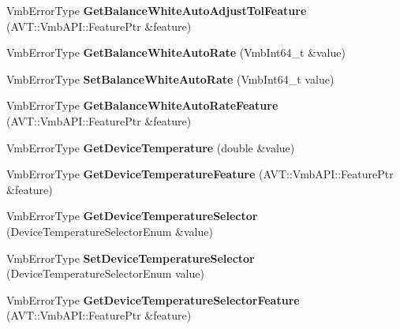 \begin{DoxyCompactItemize}
\item 
\hypertarget{classMakoCamera_aa852a35ea844d38b77ce4e8f1fbe74de}{Vmb\-Error\-Type {\bfseries Get\-Balance\-White\-Auto\-Adjust\-Tol\-Feature} (A\-V\-T\-::\-Vmb\-A\-P\-I\-::\-Feature\-Ptr \&feature)}\label{classMakoCamera_aa852a35ea844d38b77ce4e8f1fbe74de}

\item 
\hypertarget{classMakoCamera_ac4d858e1fc6bd4a1a4f96f51fa004ee5}{Vmb\-Error\-Type {\bfseries Get\-Balance\-White\-Auto\-Rate} (Vmb\-Int64\-\_\-t \&value)}\label{classMakoCamera_ac4d858e1fc6bd4a1a4f96f51fa004ee5}

\item 
\hypertarget{classMakoCamera_a0d52593c4b146e73b437f3cb22535bf0}{Vmb\-Error\-Type {\bfseries Set\-Balance\-White\-Auto\-Rate} (Vmb\-Int64\-\_\-t value)}\label{classMakoCamera_a0d52593c4b146e73b437f3cb22535bf0}

\item 
\hypertarget{classMakoCamera_a6f1bcee22a716067338e6f4e19fa2c5c}{Vmb\-Error\-Type {\bfseries Get\-Balance\-White\-Auto\-Rate\-Feature} (A\-V\-T\-::\-Vmb\-A\-P\-I\-::\-Feature\-Ptr \&feature)}\label{classMakoCamera_a6f1bcee22a716067338e6f4e19fa2c5c}

\item 
\hypertarget{classMakoCamera_a24e5dca7c7a8cf1701ace0496a3614f8}{Vmb\-Error\-Type {\bfseries Get\-Device\-Temperature} (double \&value)}\label{classMakoCamera_a24e5dca7c7a8cf1701ace0496a3614f8}

\item 
\hypertarget{classMakoCamera_ac8bc4ec4ea9c7b43d22100d87e4169e4}{Vmb\-Error\-Type {\bfseries Get\-Device\-Temperature\-Feature} (A\-V\-T\-::\-Vmb\-A\-P\-I\-::\-Feature\-Ptr \&feature)}\label{classMakoCamera_ac8bc4ec4ea9c7b43d22100d87e4169e4}

\item 
\hypertarget{classMakoCamera_a2dc29bc332961276aacd84f6ab989156}{Vmb\-Error\-Type {\bfseries Get\-Device\-Temperature\-Selector} (Device\-Temperature\-Selector\-Enum \&value)}\label{classMakoCamera_a2dc29bc332961276aacd84f6ab989156}

\item 
\hypertarget{classMakoCamera_a378595147ce175bd362dfa5963eef831}{Vmb\-Error\-Type {\bfseries Set\-Device\-Temperature\-Selector} (Device\-Temperature\-Selector\-Enum value)}\label{classMakoCamera_a378595147ce175bd362dfa5963eef831}

\item 
\hypertarget{classMakoCamera_a8f7bf02b0fa90a4b218de36b963dd674}{Vmb\-Error\-Type {\bfseries Get\-Device\-Temperature\-Selector\-Feature} (A\-V\-T\-::\-Vmb\-A\-P\-I\-::\-Feature\-Ptr \&feature)}\label{classMakoCamera_a8f7bf02b0fa90a4b218de36b963dd674}


\end{DoxyCompactItemize}
